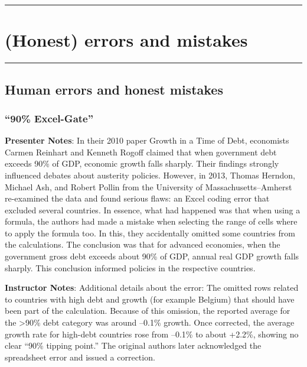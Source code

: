 \documentclass[
  english,
  letterpaper,
  DIV=11,
  numbers=noendperiod]{scrartcl}
\begin{document}
\begin{center}\rule{0.5\linewidth}{0.5pt}\end{center}

\section{(Honest) errors and mistakes}\label{honest-errors-and-mistakes}

\begin{center}\rule{0.5\linewidth}{0.5pt}\end{center}

\subsection{Human errors and honest
mistakes}\label{human-errors-and-honest-mistakes}

\subsubsection{``90\% Excel-Gate''}\label{excel-gate}

\textbf{Presenter Notes}: In their 2010 paper Growth in a Time of Debt,
economists Carmen Reinhart and Kenneth Rogoff claimed that when
government debt exceeds 90\% of GDP, economic growth falls sharply.
Their findings strongly influenced debates about austerity policies.
However, in 2013, Thomas Herndon, Michael Ash, and Robert Pollin from
the University of Massachusetts--Amherst re-examined the data and found
serious flaws: an Excel coding error that excluded several countries. In
essence, what had happened was that when using a formula, the authors
had made a mistake when selecting the range of cells where to apply the
formula too. In this, they accidentally omitted some countries from the
calculations. The conclusion was that for advanced economies, when the
government gross debt exceeds about 90\% of GDP, annual real GDP growth
falls sharply. This conclusion informed policies in the respective
countries.

\textbf{Instructor Notes}: Additional details about the error: The
omitted rows related to countries with high debt and growth (for example
Belgium) that should have been part of the calculation. Because of this
omission, the reported average for the \textgreater90\% debt category
was around --0.1\% growth. Once corrected, the average growth rate for
high-debt countries rose from --0.1\% to about +2.2\%, showing no clear
``90\% tipping point.'' The original authors later acknowledged the
spreadsheet error and issued a correction.
\end{document}
